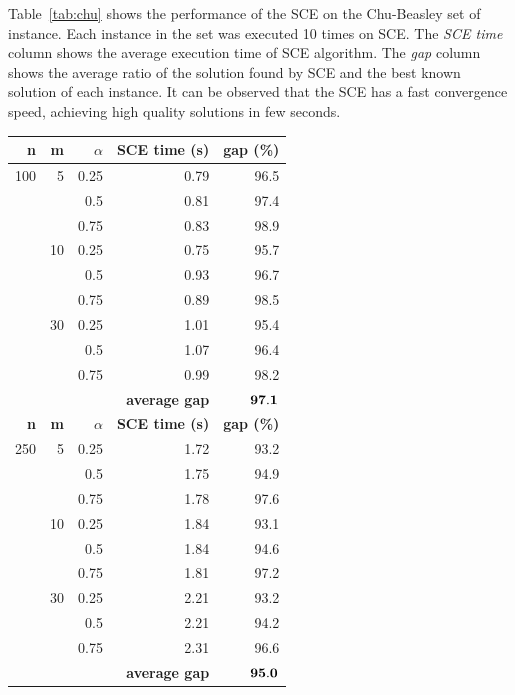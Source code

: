 \documentclass[10pt,conference, compsocconf]{IEEEtran}
\begin{document}
Table~\ref{tab:chu} shows the performance of the SCE on the Chu-Beasley set of instance.
Each instance in the set was executed 10 times on SCE.
The \textit{SCE time} column shows the average execution time of SCE algorithm.
The \textit{gap} column shows the average ratio of the solution found by SCE and
the best known solution of each instance.
It can be observed that the SCE has a fast convergence speed, achieving high
quality solutions in few seconds.

\begin{table}
{
\renewcommand{\arraystretch}{1.5}%
\fontsize{8.5pt}{1em}\selectfont 
\begin{center}
\begin{tabular}{|r|r|r|rr|} \hline
\textbf{n}   & \textbf{m}  & \textbf{$\alpha$} & \textbf{SCE time (s)} & \textbf{gap (\%)} \\ \hline
100 & 5 & 0.25 & 0.79 & 96.5 \\
    &   & 0.5 & 0.81 & 97.4 \\
    &   & 0.75 & 0.83 & 98.9 \\ \cline{2-5}
    & 10 & 0.25 & 0.75 & 95.7 \\
    &    & 0.5 & 0.93 & 96.7 \\
    &    & 0.75 & 0.89 & 98.5 \\ \cline{2-5}
    & 30 & 0.25 & 1.01 & 95.4 \\
    &    & 0.5 & 1.07 & 96.4 \\
    &    & 0.75 & 0.99 & 98.2 \\ \cline{2-5}
    & \multicolumn{3}{r}{\textbf{average gap}}  & $\bf 97.1$  \\ \hline \hline
\textbf{n}   & \textbf{m}  & \textbf{$\alpha$} & \textbf{SCE time (s)} & \textbf{gap (\%)} \\ \hline
250 & 5 & 0.25 & 1.72 & 93.2 \\
    &   & 0.5 & 1.75 & 94.9 \\
    &   & 0.75 & 1.78 & 97.6 \\ \cline{2-5}
    & 10 & 0.25 & 1.84 & 93.1 \\
    &    & 0.5 & 1.84 & 94.6 \\
    &    & 0.75 & 1.81 & 97.2 \\ \cline{2-5}
    & 30 & 0.25 & 2.21 & 93.2 \\
    &    & 0.5 & 2.21 & 94.2 \\
    &    & 0.75 & 2.31 & 96.6 \\ \cline{2-5}
    & \multicolumn{3}{r}{\textbf{average gap}}  & $\bf 95.0$  \\ \hline \hline

\end{tabular}
\end{center}}
\end{table}
\end{document}
